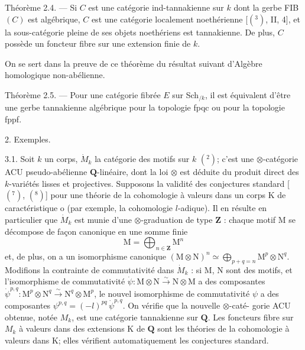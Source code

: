 \documentclass[11pt]{article}
\newcommand{\scanpage}[1]{\par\bigskip\noindent{\small\sffamily[scan #1]}\par}
\newcommand{\mspage}[1]{{\small\sffamily[p.\,#1]}}
\newcommand{\hand}[1]{\textcolor{blue}{#1}}
\begin{document}
Théorème 2.4. --- Si $C$ est une catégorie ind-tannakienne sur $k$ dont la
gerbe FIB$(C)$ est algébrique, $C$ est une catégorie localement noethérienne [$(^3)$,
II, 4], et la sous-catégorie pleine de ses objets noethériens est tannakienne.
De plus, $C$ possède un foncteur fibre sur une extension finie de $k$.

On se sert dans la preuve de ce théorème du résultat suivant d'Algèbre
homologique non-abélienne.

Théorème 2.5. --- Pour une catégorie fibrée $E$ sur Sch$_{/k}$, il est équivalent
d'être une gerbe tannakienne algébrique pour la topologie fpqc ou pour la
topologie fppf.

2. Exemples.

3.1. Soit $k$ un corps, $\dot{M}_k$ la catégorie des motifs sur $k$ $(^2)$; c'est une
$\otimes$-catégorie ACU pseudo-abélienne $\mathbf{Q}$-linéaire, dont la loi $\otimes$ est déduite
du produit direct des $k$-variétés lisses et projectives. Supposons la validité
des conjectures standard [$(^7)$, $(^8)$] pour une théorie de la cohomologie à
valeurs dans un corps K de caractéristique o (par exemple, la cohomologie
$l$-adique). Il en résulte en particulier que $\dot{M}_k$ est munie d'une $\otimes$-graduation
de type $\mathbf{Z}$ : chaque motif M se décompose de façon canonique en une somme
finie
\[ \mathrm{M} = \bigoplus_{n\in\mathbf{Z}} \mathrm{M}^n \]
et, de plus, on a un isomorphisme canonique $(\mathrm{M}\otimes\mathrm{N})^n \simeq \bigoplus_{p+q=n} \mathrm{M}^p\otimes\mathrm{N}^q$.
Modifions la contrainte de commutativité dans $\dot{M}_k$ : si M, N sont des motifs,
et l'isomorphisme de commutativité $\dot{\psi} : \mathrm{M}\otimes\mathrm{N} \xrightarrow{\sim} \mathrm{N}\otimes\mathrm{M}$ a des composantes
$\dot{\psi}^{p,q} : \mathrm{M}^p\otimes\mathrm{N}^q \xrightarrow{\sim} \mathrm{N}^q\otimes\mathrm{M}^p$, le nouvel isomorphisme de commutativité $\psi$
a des composantes $\psi^{p,q} = (-l)^{pq}\,\dot{\psi}^{p,q}$. On vérifie que la nouvelle $\otimes$-caté-%
gorie ACU obtenue, notée $M_k$, est une catégorie tannakienne sur $\mathbf{Q}$. Les
foncteurs fibre sur $M_k$ à valeurs dans des extensions K de $\mathbf{Q}$ sont les théories
de la cohomologie à valeurs dans K; elles vérifient automatiquement les
conjectures standard.

\mspage{\hand{75}}

\clearpage
\scanpage{119/76}
\mspage{( 4 )}
\end{document}
